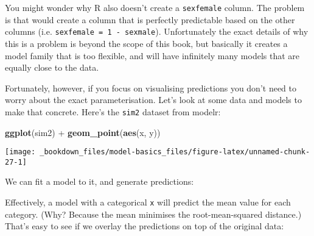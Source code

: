 \documentclass[]{book}
\newenvironment{Shaded}{\begin{snugshade}}{\end{snugshade}}
\newcommand{\KeywordTok}[1]{\textcolor[rgb]{0.13,0.29,0.53}{\textbf{{#1}}}}
\newcommand{\DataTypeTok}[1]{\textcolor[rgb]{0.13,0.29,0.53}{{#1}}}
\newcommand{\StringTok}[1]{\textcolor[rgb]{0.31,0.60,0.02}{{#1}}}
\newcommand{\CommentTok}[1]{\textcolor[rgb]{0.56,0.35,0.01}{\textit{{#1}}}}
\newcommand{\NormalTok}[1]{{#1}}
\begin{document}
You might wonder why R also doesn't create a \texttt{sexfemale} column.
The problem is that would create a column that is perfectly predictable
based on the other columns (i.e. \texttt{sexfemale\ =\ 1\ -\ sexmale}).
Unfortunately the exact details of why this is a problem is beyond the
scope of this book, but basically it creates a model family that is too
flexible, and will have infinitely many models that are equally close to
the data.

Fortunately, however, if you focus on visualising predictions you don't
need to worry about the exact parameterisation. Let's look at some data
and models to make that concrete. Here's the \texttt{sim2} dataset from
modelr:

\begin{Shaded}
\begin{Highlighting}[]
\KeywordTok{ggplot}\NormalTok{(sim2) +}\StringTok{ }
\StringTok{  }\KeywordTok{geom_point}\NormalTok{(}\KeywordTok{aes}\NormalTok{(x, y))}
\end{Highlighting}
\end{Shaded}

\begin{center}\texttt{[image: \_bookdown\_files/model-basics\_files/figure-latex/unnamed-chunk-27-1]} \end{center}

We can fit a model to it, and generate predictions:

\begin{Shaded}
\end{Shaded}

Effectively, a model with a categorical \texttt{x} will predict the mean
value for each category. (Why? Because the mean minimises the
root-mean-squared distance.) That's easy to see if we overlay the
predictions on top of the original data:
\end{document}
